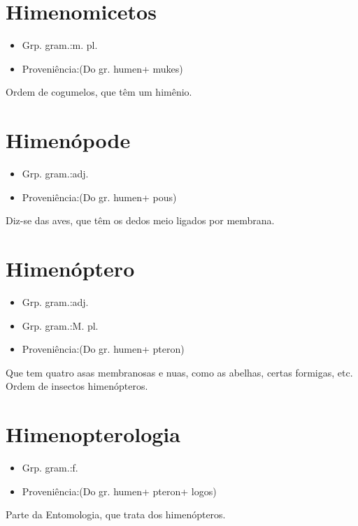 \documentclass{article}
\begin{document}
\section{Himenomicetos}
\begin{itemize}
\item {Grp. gram.:m. pl.}
\end{itemize}
\begin{itemize}
\item {Proveniência:(Do gr. \textunderscore humen\textunderscore  + \textunderscore mukes\textunderscore )}
\end{itemize}
Ordem de cogumelos, que têm um himênio.
\section{Himenópode}
\begin{itemize}
\item {Grp. gram.:adj.}
\end{itemize}
\begin{itemize}
\item {Proveniência:(Do gr. \textunderscore humen\textunderscore  + \textunderscore pous\textunderscore )}
\end{itemize}
Diz-se das aves, que têm os dedos meio ligados por membrana.
\section{Himenóptero}
\begin{itemize}
\item {Grp. gram.:adj.}
\end{itemize}
\begin{itemize}
\item {Grp. gram.:M. pl.}
\end{itemize}
\begin{itemize}
\item {Proveniência:(Do gr. \textunderscore humen\textunderscore  + \textunderscore pteron\textunderscore )}
\end{itemize}
Que tem quatro asas membranosas e nuas, como as abelhas, certas formigas, etc.
Ordem de insectos himenópteros.
\section{Himenopterologia}
\begin{itemize}
\item {Grp. gram.:f.}
\end{itemize}
\begin{itemize}
\item {Proveniência:(Do gr. \textunderscore humen\textunderscore  + \textunderscore pteron\textunderscore  + \textunderscore logos\textunderscore )}
\end{itemize}
Parte da Entomologia, que trata dos himenópteros.
\end{document}
